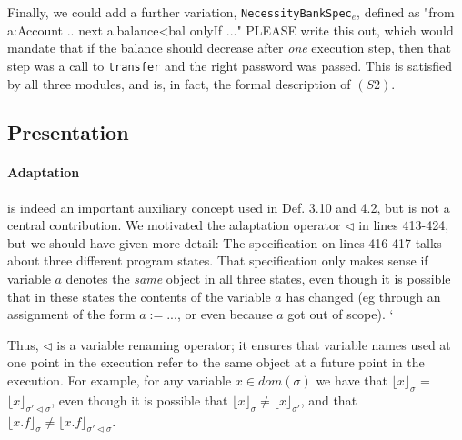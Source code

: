 \documentclass[11pt]{amsart}
\newcommand{\prg}[1]{\texttt{#1}}
\begin{document}
Finally, we could add a further variation, \prg{NecessityBankSpec}$_e$, defined as "from a:Account .. next a.balance<bal onlyIf ..." PLEASE write this out, which would mandate  that if the balance should decrease after \emph{one} execution step, then that step was a call  to \prg{transfer} and the right password was passed. This is satisfied by all three modules, and is, in fact, the formal description of $(S2)$.

\subsection*{Presentation}

\paragraph{\textbf{Adaptation}} is indeed an important auxiliary concept   used in Def. 3.10 and 4.2, but is not a central contribution. 
We motivated the adaptation operator $\triangleleft$  in lines 413-424, but we should have given more detail:
The specification on lines 416-417 talks about 
three different program states. That specification only makes sense if variable $a$ denotes
the \emph{same} object in all three states, even though it is possible that in these states the contents of the variable 
$a$ has changed (eg through an assignment of the form $a:=...$, or even because $a$ got out of scope).
`%

Thus, $\triangleleft$ is a variable renaming operator; it ensures that variable names 
used at one point in the execution refer to the same object at a future point in the execution. 
For example, for any variable $x \in dom(\sigma)$ we have that $\lfloor x \rfloor_\sigma$ = $\lfloor x \rfloor_{\sigma' \triangleleft \sigma}$, even though it is possible that $\lfloor x \rfloor_\sigma \neq \lfloor x \rfloor_{\sigma'}$, and that
$\lfloor x.f \rfloor_\sigma \neq \lfloor x.f \rfloor_{\sigma' \triangleleft \sigma}$.
\end{document}
